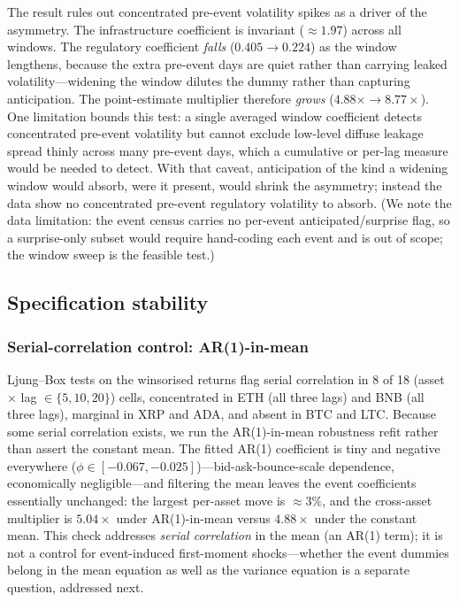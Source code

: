 \documentclass[pdflatex,sn-mathphys-num]{sn-jnl}
\theoremstyle{thmstyleone}
\theoremstyle{thmstyletwo}
\theoremstyle{thmstylethree}
\begin{document}
The result rules out concentrated pre-event volatility spikes as a driver of the asymmetry. The infrastructure coefficient is invariant ($\approx 1.97$) across all windows. The regulatory coefficient \emph{falls} ($0.405\rightarrow 0.224$) as the window lengthens, because the extra pre-event days are quiet rather than carrying leaked volatility---widening the window dilutes the dummy rather than capturing anticipation. The point-estimate multiplier therefore \emph{grows} ($4.88\times\rightarrow 8.77\times$). One limitation bounds this test: a single averaged window coefficient detects concentrated pre-event volatility but cannot exclude low-level diffuse leakage spread thinly across many pre-event days, which a cumulative or per-lag measure would be needed to detect. With that caveat, anticipation of the kind a widening window would absorb, were it present, would shrink the asymmetry; instead the data show no concentrated pre-event regulatory volatility to absorb. (We note the data limitation: the event census carries no per-event anticipated/surprise flag, so a surprise-only subset would require hand-coding each event and is out of scope; the window sweep is the feasible test.)

\subsection{Specification stability}\label{sec:spec_stability}

\subsubsection{Serial-correlation control: AR(1)-in-mean}\label{sec:ar1_control}

Ljung--Box tests on the winsorised returns flag serial correlation in 8 of 18 (asset $\times$ lag $\in\{5,10,20\}$) cells, concentrated in ETH (all three lags) and BNB (all three lags), marginal in XRP and ADA, and absent in BTC and LTC. Because some serial correlation exists, we run the AR(1)-in-mean robustness refit rather than assert the constant mean. The fitted AR(1) coefficient is tiny and negative everywhere ($\phi\in[-0.067,-0.025]$)---bid-ask-bounce-scale dependence, economically negligible---and filtering the mean leaves the event coefficients essentially unchanged: the largest per-asset move is $\approx 3\%$, and the cross-asset multiplier is $5.04\times$ under AR(1)-in-mean versus $4.88\times$ under the constant mean. This check addresses \emph{serial correlation} in the mean (an AR(1) term); it is not a control for event-induced first-moment shocks---whether the event dummies belong in the mean equation as well as the variance equation is a separate question, addressed next.
\end{document}
